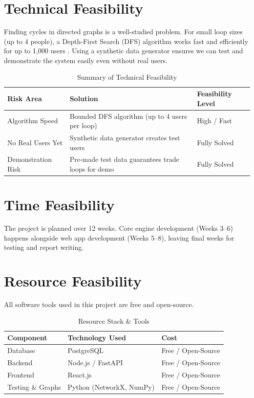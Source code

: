\section{Technical Feasibility}

Finding cycles in directed graphs is a well-studied problem. For small loop sizes (up to 4 people), a Depth-First Search (DFS) algorithm works fast and efficiently for up to 1,000 users \cite{johnson1975finding}. Using a synthetic data generator ensures we can test and demonstrate the system easily even without real users.

\begin{table}[h!]
\caption{Summary of Technical Feasibility}
\vspace{6pt}
\centering
\begin{tabularx}{\textwidth}{|l|X|l|}
\hline
\textbf{Risk Area} & \textbf{Solution} & \textbf{Feasibility Level} \\
\hline
Algorithm Speed & Bounded DFS algorithm (up to 4 users per loop) & High / Fast \\
No Real Users Yet & Synthetic data generator creates test users & Fully Solved \\
Demonstration Risk & Pre-made test data guarantees trade loops for demo & Fully Solved \\
\hline
\end{tabularx}
\end{table}

\section{Time Feasibility}

The project is planned over 12 weeks. Core engine development (Weeks 3--6) happens alongside web app development (Weeks 5--8), leaving final weeks for testing and report writing.

\section{Resource Feasibility}

All software tools used in this project are free and open-source.

\begin{table}[h!]
\caption{Resource Stack \& Tools}
\vspace{6pt}
\centering
\begin{tabularx}{\textwidth}{|l|X|l|}
\hline
\textbf{Component} & \textbf{Technology Used} & \textbf{Cost} \\
\hline
Database & PostgreSQL & Free / Open-Source \\
Backend & Node.js / FastAPI & Free / Open-Source \\
Frontend & React.js & Free / Open-Source \\
Testing \& Graphs & Python (NetworkX, NumPy) & Free / Open-Source \\
\hline
\end{tabularx}
\end{table}
